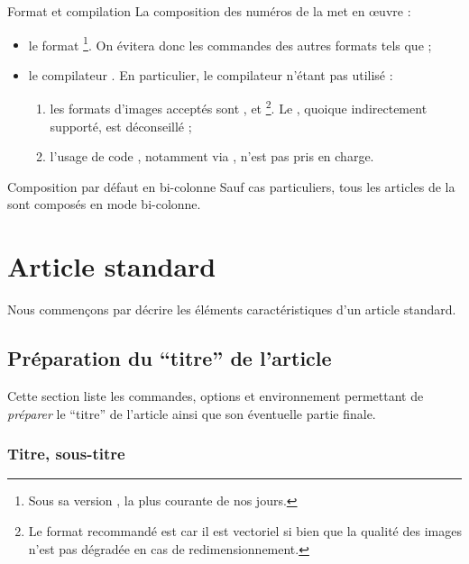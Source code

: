 \begin{dbwarning}{Format et compilation }{}
  La composition des numéros de la \gzt*{} met en œuvre :
  \begin{itemize}
  \item le format \footnote{Sous sa version , la
      plus courante de nos jours.}. On évitera donc les commandes des autres
    formats tels que  ;
  \item le compilateur . En particulier, le compilateur
     n'étant pas utilisé :
    \begin{enumerate}
    \item les formats d'images acceptés sont ,  et
      \footnote{Le format recommandé est  car il est
        vectoriel si bien que la qualité des images n'est pas dégradée en cas de
        redimensionnement.}. Le , quoique indirectement
      supporté, est déconseillé ;
    \item l'usage de code , notamment via
      , n'est pas pris en charge.
    \end{enumerate}
  \end{itemize}
\end{dbwarning}

\begin{dbremark}{Composition par défaut en bi-colonne}{}
  Sauf cas particuliers, tous les articles de la \gzt{} sont composés en mode
  bi-colonne.
\end{dbremark}

\section{Article standard}
\label{sec-article-standard}

Nous commençons par décrire les éléments caractéristiques d'un article standard.

\subsection{Préparation du \enquote{titre} de l'article}
\label{sec-prep-de-lart}

Cette section liste les commandes, options et environnement permettant de
\emph{préparer} le \enquote{titre} de l'article ainsi que son éventuelle partie
finale.

\subsubsection{Titre, sous-titre}
\label{sec-titre}


